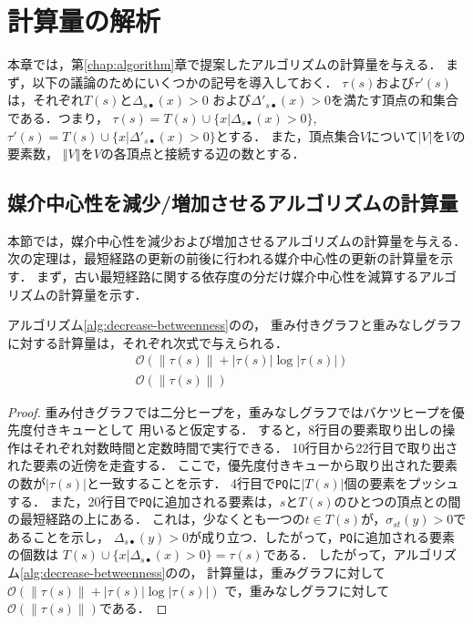 \chapter{計算量の解析}
\label{chap:complexity-analysis}

本章では，第\ref{chap:algorithm}章で提案したアルゴリズムの計算量を与える．
まず，以下の議論のためにいくつかの記号を導入しておく．
$\tau(s)$および$\tau'(s)$は，それぞれ$T(s)$と$\Delta_{s\bullet}(x)>0$
および$\Delta'_{s\bullet}(x)>0$を満たす頂点の和集合である．つまり，
$\tau(s)=T(s)\cup\{x|\Delta_{s\bullet}(x)>0\}$,
$\tau'(s)=T(s)\cup\{x|\Delta'_{s\bullet}(x)>0\}$とする．
また，頂点集合$V$について$\left\vert V\right\vert$を$V$の要素数，
$\left\Vert V\right\Vert$を$V$の各頂点と接続する辺の数とする．

\section{媒介中心性を減少/増加させるアルゴリズムの計算量}

本節では，媒介中心性を減少および増加させるアルゴリズムの計算量を与える．
次の定理は，最短経路の更新の前後に行われる媒介中心性の更新の計算量を示す．
まず，古い最短経路に関する依存度の分だけ媒介中心性を減算するアルゴリズムの計算量を示す．

\begin{theorem}
  \label{thm:decrease-betweenness-weight-complexity}
  アルゴリズム\ref{alg:decrease-betweenness}のの，
  重み付きグラフと重みなしグラフに対する計算量は，それぞれ次式で与えられる．
  \begin{align}
    &\mathcal{O}\left(\left\|\tau(s)\right\|+\left|\tau(s)\right|\log\left|\tau(s)\right|\right)
    \label{eq:decrease-betweenness-weighted-complexity} \\
    &\mathcal{O}\left(\left\|\tau(s)\right\|\right)
    \label{eq:decrease-betweenness-unweighted-complexity}
  \end{align}
\end{theorem}
\begin{proof}
  重み付きグラフでは二分ヒープを，重みなしグラフではバケツヒープを優先度付きキューとして
  用いると仮定する．
  すると，8行目の要素取り出しの操作はそれぞれ対数時間と定数時間で実行できる．
  10行目から22行目で取り出された要素の近傍を走査する．
  ここで，優先度付きキューから取り出された要素の数が$|\tau(s)|$と一致することを示す．
  4行目で\texttt{PQ}に$|T(s)|$個の要素をプッシュする．
  また，20行目で\texttt{PQ}に追加される要素は，$s$と$T(s)$のひとつの頂点との間の最短経路の上にある．
  これは，少なくとも一つの$t\in T(s)$が，$\sigma_{st}(y)>0$であることを示し，
  $\Delta_{s\bullet}(y)>0$が成り立つ．したがって，\texttt{PQ}に追加される要素の個数は
  $T(s)\cup\{x|\Delta_{s\bullet}(x)>0\}=\tau(s)$である．
  したがって，アルゴリズム\ref{alg:decrease-betweenness}のの，
  計算量は，重みグラフに対して$\mathcal{O}(\|\tau(s)\|+|\tau(s)|\log|\tau(s)|)$
  で，重みなしグラフに対して$\mathcal{O}(\|\tau(s)\|)$である．
\end{proof}

